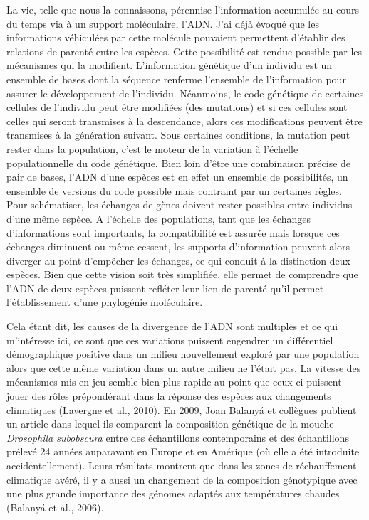 La vie, telle que nous la connaissons, pérennise l'information accumulée
au cours du temps via à un support moléculaire, l'ADN. J'ai déjà évoqué
que les informations véhiculées par cette molécule pouvaient permettent
d'établir des relations de parenté entre les espèces. Cette possibilité
est rendue possible par les mécanismes qui la modifient. L'information
génétique d'un individu est un ensemble de bases dont la séquence
renferme l'ensemble de l'information pour assurer le développement de
l'individu. Néanmoins, le code génétique de certaines cellules de
l'individu peut être modifiées (des mutations) et si ces cellules sont
celles qui seront transmises à la descendance, alors ces modifications
peuvent être transmises à la génération suivant. Sous certaines
conditions, la mutation peut rester dans la population, c'est le moteur
de la variation à l'échelle populationnelle du code génétique. Bien loin
d'être une combinaison précise de pair de bases, l'ADN d'une espèces est
en effet un ensemble de possibilités, un ensemble de versions du code
possible mais contraint par un certaines règles. Pour schématiser, les
échanges de gènes doivent rester possibles entre individus d'une même
espèce. A l'échelle des populations, tant que les échanges
d'informations sont importants, la compatibilité est assurée mais
lorsque ces échanges diminuent ou même cessent, les supports
d'information peuvent alors diverger au point d'empêcher les échanges,
ce qui conduit à la distinction deux espèces. Bien que cette vision soit
très simplifiée, elle permet de comprendre que l'ADN de deux espèces
puissent refléter leur lien de parenté qu'il permet l'établissement
d'une phylogénie moléculaire.

Cela étant dit, les causes de la divergence de l'ADN sont multiples et
ce qui m'intéresse ici, ce sont que ces variations puissent engendrer un
différentiel démographique positive dans un milieu nouvellement exploré
par une population alors que cette même variation dans un autre milieu
ne l'était pas. La vitesse des mécanismes mis en jeu semble bien plus
rapide au point que ceux-ci puissent jouer des rôles prépondérant dans
la réponse des espèces aux changements climatiques (Lavergne et al.,
2010). En 2009, Joan Balanyá et collègues publient un article dans
lequel ils comparent la composition génétique de la mouche
\emph{Drosophila subobscura} entre des échantillons contemporains et des
échantillons prélevé 24 années auparavant en Europe et en Amérique (où
elle a été introduite accidentellement). Leurs résultats montrent que
dans les zones de réchauffement climatique avéré, il y a aussi un
changement de la composition génotypique avec une plus grande importance
des génomes adaptés aux températures chaudes (Balanyá et al., 2006).

